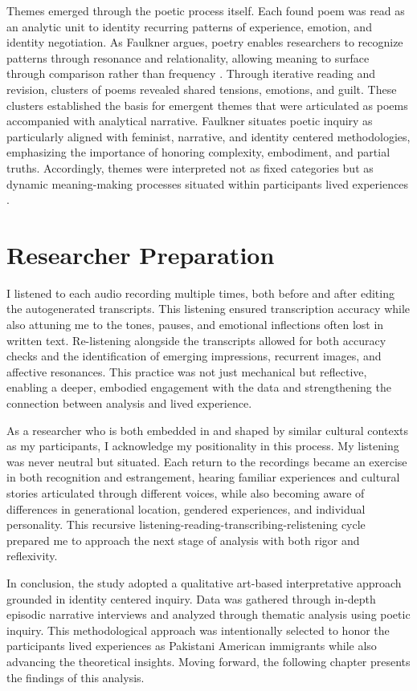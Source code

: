 Themes emerged through the poetic process itself. Each found poem was read as an analytic unit to identity recurring patterns of experience, emotion, and identity negotiation. As Faulkner argues, poetry enables researchers to recognize patterns through resonance and relationality, allowing meaning to surface through comparison rather than frequency \citep{faulknerPoeticInquiryCraft2019}. Through iterative reading and revision, clusters of poems revealed shared tensions, emotions, and guilt. These clusters established the basis for emergent themes that were articulated as poems accompanied with analytical narrative. Faulkner situates poetic inquiry as particularly aligned with feminist, narrative, and identity centered methodologies, emphasizing the importance of honoring complexity, embodiment, and partial truths. Accordingly, themes were interpreted not as fixed categories but as dynamic meaning-making processes situated within participants lived experiences \citep{faulknerPoeticInquiryCraft2019}.

\section{Researcher Preparation}

I listened to each audio recording multiple times, both before and after editing the autogenerated transcripts. This listening ensured transcription accuracy while also attuning me to the tones, pauses, and emotional inflections often lost in written text. Re-listening alongside the transcripts allowed for both accuracy checks and the identification of emerging impressions, recurrent images, and affective resonances. This practice was not just mechanical but reflective, enabling a deeper, embodied engagement with the data and strengthening the connection between analysis and lived experience.

As a researcher who is both embedded in and shaped by similar cultural contexts as my participants, I acknowledge my positionality in this process. My listening was never neutral but situated. Each return to the recordings became an exercise in both recognition and estrangement, hearing familiar experiences and cultural stories articulated through different voices, while also becoming aware of differences in generational location, gendered experiences, and individual personality. This recursive listening-reading-transcribing-relistening cycle prepared me to approach the next stage of analysis with both rigor and reflexivity.

In conclusion, the study adopted a qualitative art-based interpretative approach grounded in identity centered inquiry. Data was gathered through in-depth episodic narrative interviews and analyzed through thematic analysis using poetic inquiry. This methodological approach was intentionally selected to honor the participants lived experiences as Pakistani American immigrants while also advancing the theoretical insights. Moving forward, the following chapter presents the findings of this analysis.
